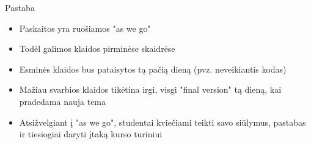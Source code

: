 \documentclass[11pt,xcolor=table]{beamer}
\begin{document}
\begin{frame}{Pastaba}
\begin{itemize}
\item Paskaitos yra ruošiamos "as we go"
\item Todėl galimos klaidos pirminėse skaidrėse
\item Esminės klaidos bus pataisytos tą pačią dieną (pvz. neveikiantis kodas)
\item Mažiau svarbios klaidos tikėtina irgi, visgi "final version" tą dieną, kai pradedama nauja tema
\item Atsižvelgiant į "as we go", studentai kviečiami teikti savo siūlymus, pastabas ir tiesiogiai daryti įtaką kurso turiniui
\end{itemize}
\end{frame}
\end{document}
